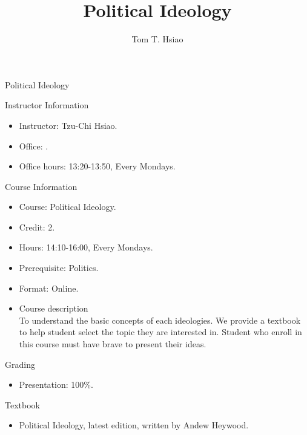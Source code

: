 \documentclass{article}
\title{Political Ideology}
\author{Tom T. Hsiao}
\date{}
\begin{document}
\begin{center}
\fontsize{16pt}{16pt}\selectfont Political Ideology \\
\end{center}
\fontsize{14pt}{14pt}\selectfont
\begin{flushleft}
Instructor Information
\end{flushleft}
\begin{itemize}
\item Instructor: Tzu-Chi Hsiao. \\
\item Office: . \\
\item Office hours: 13:20-13:50, Every Mondays. \\
\end{itemize}
Course Information \\
\begin{itemize}
\item Course: Political Ideology. \\
\item Credit: 2. \\
\item Hours: 14:10-16:00, Every Mondays. \\
\item Prerequisite: Politics. \\
\item Format: Online. \\
\item Course description \\
To understand the basic concepts of each ideologies. We provide a textbook to help student select the topic they are interested in. Student who enroll in this course must have brave to present their ideas. \\
\end{itemize}
\begin{flushleft}
Grading \\
\end{flushleft}
\begin{itemize}
\item Presentation: 100\%. \\
\end{itemize}
Textbook \\
\begin{itemize}
\item Political Ideology, latest edition, written by Andew Heywood. \\
\end{itemize}
\end{document}
